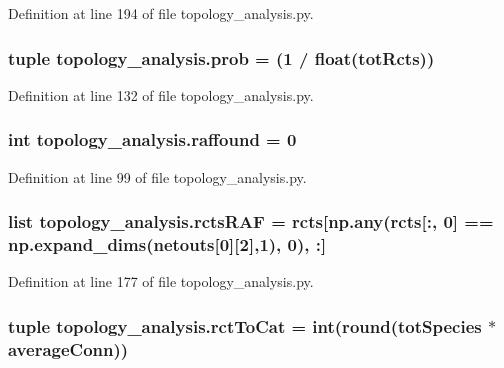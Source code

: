 Definition at line 194 of file topology\+\_\+analysis.\+py.

\hypertarget{a00159_aad2c05e3d2146196ed236911dd796f6e}{
\subsubsection[{prob}]{\setlength{\rightskip}{0pt plus 5cm}tuple topology\+\_\+analysis.\+prob = (1 / float({\bf tot\+Rcts}))}}\label{a00159_aad2c05e3d2146196ed236911dd796f6e}


Definition at line 132 of file topology\+\_\+analysis.\+py.

\hypertarget{a00159_ad625a009a3da81a04b490e62975ecf39}{
\subsubsection[{raffound}]{\setlength{\rightskip}{0pt plus 5cm}int topology\+\_\+analysis.\+raffound = 0}}\label{a00159_ad625a009a3da81a04b490e62975ecf39}


Definition at line 99 of file topology\+\_\+analysis.\+py.

\hypertarget{a00159_aeb909c76682b690cc5ab6aca5ac37c4d}{
\subsubsection[{rcts\+R\+A\+F}]{\setlength{\rightskip}{0pt plus 5cm}list topology\+\_\+analysis.\+rcts\+R\+A\+F = rcts\mbox{[}np.\+any(rcts\mbox{[}\+:, 0\mbox{]} == np.\+expand\+\_\+dims({\bf netouts}\mbox{[}0\mbox{]}\mbox{[}2\mbox{]},1), 0), \+:\mbox{]}}}\label{a00159_aeb909c76682b690cc5ab6aca5ac37c4d}


Definition at line 177 of file topology\+\_\+analysis.\+py.

\hypertarget{a00159_afa804d4b1d39a63de9f14e5ab379ae34}{
\subsubsection[{rct\+To\+Cat}]{\setlength{\rightskip}{0pt plus 5cm}tuple topology\+\_\+analysis.\+rct\+To\+Cat = int(round({\bf tot\+Species} $\ast$ {\bf average\+Conn}))}}\label{a00159_afa804d4b1d39a63de9f14e5ab379ae34}


